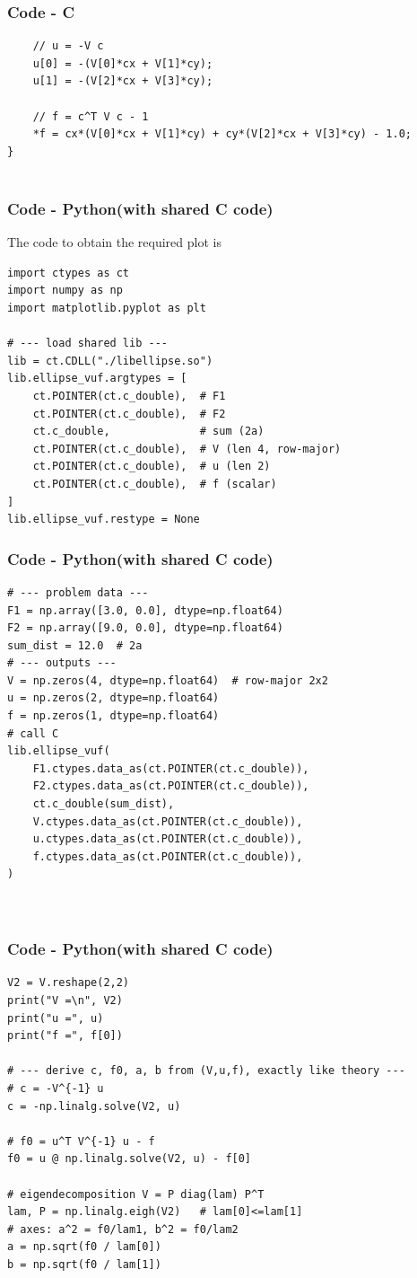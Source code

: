\documentclass{beamer}
\theoremstyle{remark}
\numberwithin{equation}{section}
\begin{document}
        \begin{frame}[fragile]
    \frametitle{Code - C}
    \begin{lstlisting}
    // u = -V c
    u[0] = -(V[0]*cx + V[1]*cy);
    u[1] = -(V[2]*cx + V[3]*cy);

    // f = c^T V c - 1
    *f = cx*(V[0]*cx + V[1]*cy) + cy*(V[2]*cx + V[3]*cy) - 1.0;
}


    \end{lstlisting}
    \end{frame}

\begin{frame}[fragile]
    \frametitle{Code - Python(with shared C code)}
    The code to obtain the required plot is
    \begin{lstlisting}
import ctypes as ct
import numpy as np
import matplotlib.pyplot as plt

# --- load shared lib ---
lib = ct.CDLL("./libellipse.so")
lib.ellipse_vuf.argtypes = [
    ct.POINTER(ct.c_double),  # F1
    ct.POINTER(ct.c_double),  # F2
    ct.c_double,              # sum (2a)
    ct.POINTER(ct.c_double),  # V (len 4, row-major)
    ct.POINTER(ct.c_double),  # u (len 2)
    ct.POINTER(ct.c_double),  # f (scalar)
]
lib.ellipse_vuf.restype = None

\end{lstlisting}
\end{frame}

\begin{frame}[fragile]
\frametitle{Code - Python(with shared C code)}
\begin{lstlisting}
# --- problem data ---
F1 = np.array([3.0, 0.0], dtype=np.float64)
F2 = np.array([9.0, 0.0], dtype=np.float64)
sum_dist = 12.0  # 2a
# --- outputs ---
V = np.zeros(4, dtype=np.float64)  # row-major 2x2
u = np.zeros(2, dtype=np.float64)
f = np.zeros(1, dtype=np.float64)
# call C
lib.ellipse_vuf(
    F1.ctypes.data_as(ct.POINTER(ct.c_double)),
    F2.ctypes.data_as(ct.POINTER(ct.c_double)),
    ct.c_double(sum_dist),
    V.ctypes.data_as(ct.POINTER(ct.c_double)),
    u.ctypes.data_as(ct.POINTER(ct.c_double)),
    f.ctypes.data_as(ct.POINTER(ct.c_double)),
)



\end{lstlisting}
\end{frame}

\begin{frame}[fragile]
\frametitle{Code - Python(with shared C code)}
\begin{lstlisting}
V2 = V.reshape(2,2)
print("V =\n", V2)
print("u =", u)
print("f =", f[0])

# --- derive c, f0, a, b from (V,u,f), exactly like theory ---
# c = -V^{-1} u
c = -np.linalg.solve(V2, u)

# f0 = u^T V^{-1} u - f
f0 = u @ np.linalg.solve(V2, u) - f[0]

# eigendecomposition V = P diag(lam) P^T
lam, P = np.linalg.eigh(V2)   # lam[0]<=lam[1]
# axes: a^2 = f0/lam1, b^2 = f0/lam2
a = np.sqrt(f0 / lam[0])
b = np.sqrt(f0 / lam[1])


\end{lstlisting}
\end{frame}
\end{document}
